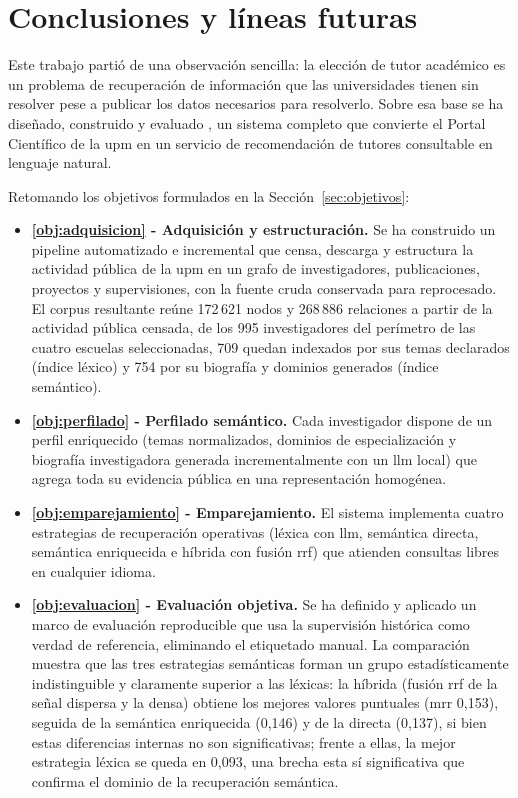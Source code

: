 \chapter{Conclusiones y líneas futuras}
\label{ch:conclusiones}

Este trabajo partió de una observación sencilla: la elección de tutor académico es un problema de recuperación de información que las universidades tienen sin resolver pese a publicar los datos necesarios para resolverlo.
Sobre esa base se ha diseñado, construido y evaluado \proyecto, un sistema completo que convierte el Portal Científico de la \gls{upm} en un servicio de recomendación de tutores consultable en lenguaje natural.

Retomando los objetivos formulados en la Sección~\ref{sec:objetivos}:

\begin{itemize}
    \item \textbf{\ref{obj:adquisicion} - Adquisición y estructuración.}
    Se ha construido un pipeline automatizado e incremental que censa, descarga y estructura la actividad pública de la \gls{upm} en un grafo de investigadores, publicaciones, proyectos y supervisiones, con la fuente cruda conservada para reprocesado.
    El corpus resultante reúne 172\,621 nodos y 268\,886 relaciones a partir de la actividad pública censada, de los 995 investigadores del perímetro de las cuatro escuelas seleccionadas, 709 quedan indexados por sus temas declarados (índice léxico) y 754 por su biografía y dominios generados (índice semántico).
    \item \textbf{\ref{obj:perfilado} - Perfilado semántico.}
    Cada investigador dispone de un perfil enriquecido (temas normalizados, dominios de especialización y biografía investigadora generada incrementalmente con un \gls{llm} local) que agrega toda su evidencia pública en una representación homogénea.
    \item \textbf{\ref{obj:emparejamiento} - Emparejamiento.}
    El sistema implementa cuatro estrategias de recuperación operativas (léxica con \gls{llm}, semántica directa, semántica enriquecida e híbrida con fusión \gls{rrf}) que atienden consultas libres en cualquier idioma.
    \item \textbf{\ref{obj:evaluacion} - Evaluación objetiva.}
    Se ha definido y aplicado un marco de evaluación reproducible que usa la supervisión histórica como verdad de referencia, eliminando el etiquetado manual.
    La comparación muestra que las tres estrategias semánticas forman un grupo estadísticamente indistinguible y claramente superior a las léxicas: la híbrida (fusión \gls{rrf} de la señal dispersa y la densa) obtiene los mejores valores puntuales (\gls{mrr} 0,153), seguida de la semántica enriquecida (0,146) y de la directa (0,137), si bien estas diferencias internas no son significativas; frente a ellas, la mejor estrategia léxica se queda en 0,093, una brecha esta sí significativa que confirma el dominio de la recuperación semántica.

\end{itemize}
